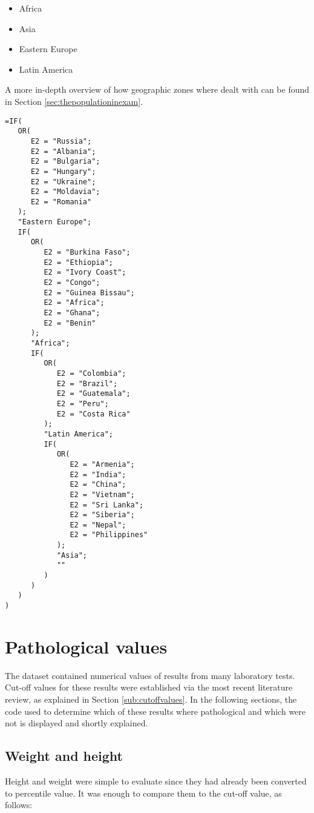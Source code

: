 \begin{itemize}
    \item Africa
    \item Asia
    \item Eastern Europe
    \item Latin America
\end{itemize}

A more in-depth overview of how geographic zones where dealt with can be found in Section \ref{sec:thepopulationinexam}.

\begin{lstlisting}
=IF(
   OR(
      E2 = "Russia";
      E2 = "Albania";
      E2 = "Bulgaria";
      E2 = "Hungary";
      E2 = "Ukraine";
      E2 = "Moldavia";
      E2 = "Romania"
   );
   "Eastern Europe";
   IF(
      OR(
         E2 = "Burkina Faso";
         E2 = "Ethiopia";
         E2 = "Ivory Coast";
         E2 = "Congo";
         E2 = "Guinea Bissau";
         E2 = "Africa";
         E2 = "Ghana";
         E2 = "Benin"
      );
      "Africa";
      IF(
         OR(
            E2 = "Colombia";
            E2 = "Brazil";
            E2 = "Guatemala";
            E2 = "Peru";
            E2 = "Costa Rica"
         );
         "Latin America";
         IF(
            OR(
               E2 = "Armenia";
               E2 = "India";
               E2 = "China";
               E2 = "Vietnam";
               E2 = "Sri Lanka";
               E2 = "Siberia";
               E2 = "Nepal";
               E2 = "Philippines"
            );
            "Asia";
            ""
         )
      )
   )
)
\end{lstlisting}

\section{Pathological values}\label{asec:pathologicalvalues}
The dataset contained numerical values of results from many laboratory tests. Cut-off values for these results were established via the most recent literature review, as explained in Section \ref{sub:cutoffvalues}. In the following sections, the code used to determine which of these results where pathological and which were not is displayed and shortly explained.

\subsection{Weight and height}\label{asub:patweightandheight}
Height and weight were simple to evaluate since they had already been converted to percentile value. It was enough to compare them to the cut-off value, as follows:


